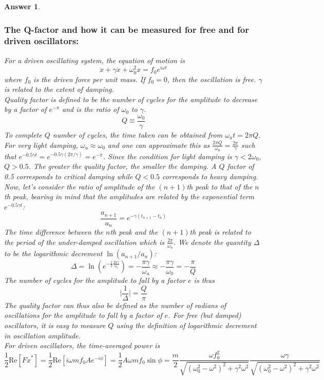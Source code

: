 \documentclass[a4paper]{article}
\newtheorem{ans}{Answer}[subsection]
\theoremstyle{new}
\begin{document}
\begin{ans}
\subsubsection*{The Q-factor and how it can be measured for free and for driven oscillators:}
For a driven oscillating system, the equation of motion is
$$\ddot{x}+\gamma\dot{x}+\omega_0^2x=f_0e^{i\omega t}$$
where $f_0$ is the driven force per unit mass. If $f_0=0$, then the oscillation is free. $\gamma$ is related to the extent of damping.\\[5pt]
Quality factor is defined to be the number of cycles for the amplitude to decrease by a factor of $e^{-\pi}$ and is the ratio of $\omega_0$ to $\gamma$. 
$$Q\equiv\frac{\omega_0}{\gamma}$$
To complete $Q$ number of cycles, the time taken can be obtained from $\omega_ut=2\pi Q$. For very light damping, $\omega_u\approx\omega_0$ and one can approximate this as $\frac{2\pi Q}{\omega_0}=\frac{2\pi}{\gamma}$ such that $e^{-0.5\gamma t}=e^{-0.5\gamma(2\pi/\gamma)}=e^{-\pi}$. Since the condition for light damping is $\gamma<2\omega_0$, $Q>0.5$. The greater the quality factor, the smaller the damping. A $Q$ factor of 0.5 corresponds to critical damping while $Q<0.5$ corresponds to heavy damping.\\[5pt]
Now, let's consider the ratio of amplitude of the $(n+1)$th peak to that of the $n$th peak, bearing in mind that the amplitudes are related by the exponential term $e^{-0.5\gamma t}$:
$$\frac{a_{n+1}}{a_n}=e^{-\gamma(t_{n+1}-t_n)}$$
The time difference between the $n$th peak and the $(n+1)$th peak is related to the period of the under-damped oscillation which is $\frac{2\pi}{\omega_u}$. We denote the quantity $\Delta$ to be the logarithmic decrement $\ln(a_{n+1}/a_n)$:
$$\Delta=\ln(e^{-\frac{1}{2}\frac{2\pi\gamma}{\omega_u}})=-\frac{\pi\gamma}{\omega_u}\approx-\frac{\pi\gamma}{\omega_0}=-\frac{\pi}{Q}$$
The number of cycles for the amplitude to fall by a factor $e$ is thus
$$\bigg|\frac{1}{\Delta}\bigg|=\frac{Q}{\pi}$$
The quality factor can thus also be defined as the number of radians of oscillations for the amplitude to fall by a factor of $e$. For free (but damped) oscillators, it is easy to measure $Q$ using the definition of logarithmic decrement in oscillation amplitude.\\[5pt]
For driven oscillators, the time-averaged power is
$$\frac{1}{2}\text{Re}[F\dot{x}^*]=\frac{1}{2}\text{Re}[i\omega mf_0Ae^{-i\phi}]=\frac{1}{2}A\omega m f_0\sin\phi=\frac{m}{2}\frac{\omega f_0^2}{\sqrt{(\omega_0^2-\omega^2)^2+\gamma^2\omega^2}}\frac{\omega\gamma}{\sqrt{(\omega_0^2-\omega^2)^2+\gamma^2\omega^2}}$$

\end{ans}
\end{document}

